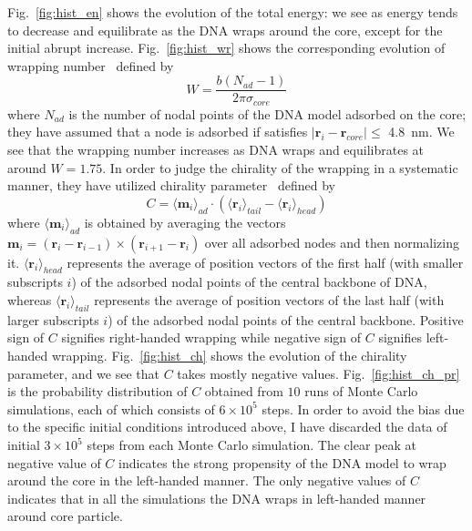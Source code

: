 \documentclass[a4paper,10pt]{article}
\begin{document}
Fig.~\ref{fig:hist_en} shows the evolution of the total energy: we see as energy tends to decrease and equilibrate as the DNA wraps around the core, except for the initial abrupt increase.
Fig.~\ref{fig:hist_wr} shows the corresponding evolution of wrapping number~\cite{very_old} defined by
\begin{equation}\label{eq:wrap_num}
W=\dfrac{b\left(N_{ad}-1\right)}{2\pi\sigma_{core}}
\end{equation}
where $N_{ad}$ is the number of nodal points of the DNA model adsorbed on the core; they have assumed that a node is adsorbed if satisfies $\left|\textbf{r}_i-\textbf{r}_{core}\right|\leq$ \SI{4.8}{\nm}.
We see that the wrapping number increases as DNA wraps and equilibrates at around $W=1.75$.
In order to judge the chirality of the wrapping in a systematic manner, they have utilized chirality parameter~\cite{very_old} defined by
\begin{equation}\label{eq:chirality}
C=\langle\textbf{m}_{i}\rangle_{ad}\cdot\left(\langle\textbf{r}_{i}\rangle_{tail}-\langle\textbf{r}_{i}\rangle_{head}\right)
\end{equation}
where $\langle\textbf{m}_{i}\rangle_{ad}$ is obtained by averaging the vectors $\textbf{m}_i=\left(\textbf{r}_{i}-\textbf{r}_{i-1}\right)\times\left(\textbf{r}_{i+1}-\textbf{r}_{i}\right)$ over all adsorbed nodes and then normalizing it.
$\langle\textbf{r}_{i}\rangle_{head}$ represents the average of position vectors of the first half (with smaller subscripts $i$) of the adsorbed nodal points of the central backbone of DNA, whereas $\langle\textbf{r}_{i}\rangle_{tail}$ represents the average of position vectors of the last half (with larger subscripts $i$) of the adsorbed nodal points of the central backbone.
Positive sign of $C$ signifies right-handed wrapping while negative sign of $C$ signifies left-handed wrapping.
Fig.~\ref{fig:hist_ch} shows the evolution of the chirality parameter, and we see that $C$ takes mostly negative values.
Fig.~\ref{fig:hist_ch_pr} is the probability distribution of $C$ obtained from $10$ runs of Monte Carlo simulations, each of which consists of $6\times 10^5$ steps.
In order to avoid the bias due to the specific initial conditions introduced above, I have discarded the data of initial $3\times10^5$ steps from each Monte Carlo simulation.
The clear peak at negative value of $C$ indicates the strong propensity of the DNA model to wrap around the core in the left-handed manner.
The only negative values of $C$ indicates that in all the simulations the DNA wraps in left-handed manner around core particle.
\end{document}
